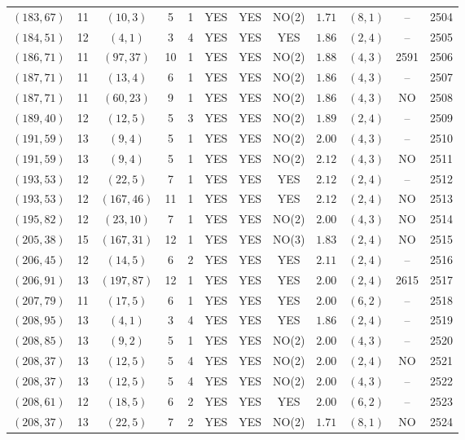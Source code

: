 \begin{longtable}{|c|c|c|c|c|c|c|c|c|c|c|c|}
$(183,67)$ & 11 & $(10,3)$ & 5 & 1 & YES & YES & NO(2) & $1.71$ & $(8,1)$ & -- & 2504\\
$(184,51)$ & 12 & $(4,1)$ & 3 & 4 & YES & YES & YES & $1.86$ & $(2,4)$ & -- & 2505\\
$(186,71)$ & 11 & $(97,37)$ & 10 & 1 & YES & YES & NO(2) & $1.88$ & $(4,3)$ & 2591 & 2506\\
$(187,71)$ & 11 & $(13,4)$ & 6 & 1 & YES & YES & NO(2) & $1.86$ & $(4,3)$ & -- & 2507\\
$(187,71)$ & 11 & $(60,23)$ & 9 & 1 & YES & YES & NO(2) & $1.86$ & $(4,3)$ & NO & 2508\\
$(189,40)$ & 12 & $(12,5)$ & 5 & 3 & YES & YES & NO(2) & $1.89$ & $(2,4)$ & -- & 2509\\
$(191,59)$ & 13 & $(9,4)$ & 5 & 1 & YES & YES & NO(2) & $2.00$ & $(4,3)$ & -- & 2510\\
$(191,59)$ & 13 & $(9,4)$ & 5 & 1 & YES & YES & NO(2) & $2.12$ & $(4,3)$ & NO & 2511\\
$(193,53)$ & 12 & $(22,5)$ & 7 & 1 & YES & YES & YES & $2.12$ & $(2,4)$ & -- & 2512\\
$(193,53)$ & 12 & $(167,46)$ & 11 & 1 & YES & YES & YES & $2.12$ & $(2,4)$ & NO & 2513\\
$(195,82)$ & 12 & $(23,10)$ & 7 & 1 & YES & YES & NO(2) & $2.00$ & $(4,3)$ & NO & 2514\\
$(205,38)$ & 15 & $(167,31)$ & 12 & 1 & YES & YES & NO(3) & $1.83$ & $(2,4)$ & NO & 2515\\
$(206,45)$ & 12 & $(14,5)$ & 6 & 2 & YES & YES & YES & $2.11$ & $(2,4)$ & -- & 2516\\
$(206,91)$ & 13 & $(197,87)$ & 12 & 1 & YES & YES & YES & $2.00$ & $(2,4)$ & 2615 & 2517\\
$(207,79)$ & 11 & $(17,5)$ & 6 & 1 & YES & YES & YES & $2.00$ & $(6,2)$ & -- & 2518\\
$(208,95)$ & 13 & $(4,1)$ & 3 & 4 & YES & YES & YES & $1.86$ & $(2,4)$ & -- & 2519\\
$(208,85)$ & 13 & $(9,2)$ & 5 & 1 & YES & YES & NO(2) & $2.00$ & $(4,3)$ & -- & 2520\\
$(208,37)$ & 13 & $(12,5)$ & 5 & 4 & YES & YES & NO(2) & $2.00$ & $(2,4)$ & NO & 2521\\
$(208,37)$ & 13 & $(12,5)$ & 5 & 4 & YES & YES & NO(2) & $2.00$ & $(4,3)$ & -- & 2522\\
$(208,61)$ & 12 & $(18,5)$ & 6 & 2 & YES & YES & YES & $2.00$ & $(6,2)$ & -- & 2523\\
$(208,37)$ & 13 & $(22,5)$ & 7 & 2 & YES & YES & NO(2) & $1.71$ & $(8,1)$ & NO & 2524\\

\end{longtable}
